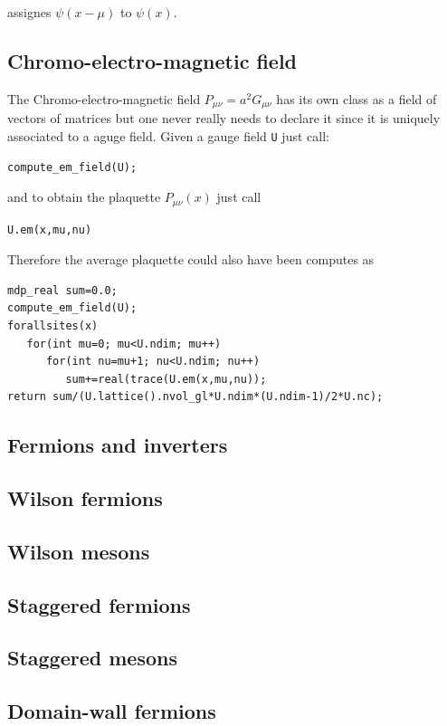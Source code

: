 assignes $\psi (x-\mu )$ to $\psi (x)$.

\subsection{Chromo-electro-magnetic field}

The Chromo-electro-magnetic field $P_{\mu \nu }=a^2G_{\mu \nu }$ has its own
class as a field of vectors of matrices but one never really needs to
declare it since it is uniquely associated to a aguge field. Given a gauge
field {\tt U} just call:
\begin{verbatim}
compute_em_field(U);
\end{verbatim}

and to obtain the plaquette $P_{\mu \nu }(x)$ just call
\begin{verbatim}
U.em(x,mu,nu)
\end{verbatim}

Therefore the average plaquette could also have been computes as
\begin{verbatim}
mdp_real sum=0.0;
compute_em_field(U);
forallsites(x)
   for(int mu=0; mu<U.ndim; mu++)
      for(int nu=mu+1; nu<U.ndim; nu++)
         sum+=real(trace(U.em(x,mu,nu));
return sum/(U.lattice().nvol_gl*U.ndim*(U.ndim-1)/2*U.nc);
\end{verbatim}

\subsection{Fermions and inverters}

\subsection{Wilson fermions}

\subsection{Wilson mesons}

\subsection{Staggered fermions}

\subsection{Staggered mesons}

\subsection{Domain-wall fermions}

